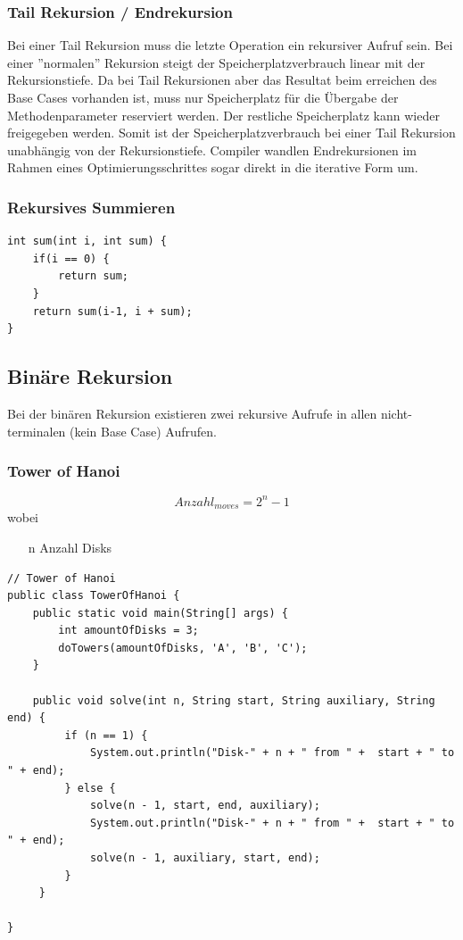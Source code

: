 \subsubsection{Tail Rekursion / Endrekursion}
Bei einer Tail Rekursion muss die letzte Operation ein rekursiver Aufruf sein. Bei einer ''normalen'' Rekursion steigt der Speicherplatzverbrauch linear mit der Rekursionstiefe. Da bei Tail Rekursionen aber das Resultat beim erreichen des Base Cases vorhanden ist, muss nur Speicherplatz für die Übergabe der Methodenparameter reserviert werden. Der restliche Speicherplatz kann wieder freigegeben werden.  Somit ist der Speicherplatzverbrauch bei einer Tail Rekursion unabhängig von der Rekursionstiefe. Compiler wandlen Endrekursionen im Rahmen eines Optimierungsschrittes sogar direkt in die iterative Form um.

\subsubsection{Rekursives Summieren}
\begin{lstlisting}
int sum(int i, int sum) { 
	if(i == 0) {
		return sum; 
	} 
	return sum(i-1, i + sum);  
}
\end{lstlisting}



\subsection{Binäre Rekursion}
Bei der binären Rekursion existieren zwei rekursive Aufrufe in allen nicht-terminalen (kein Base Case) Aufrufen. 

\subsubsection{Tower of Hanoi}
\[
	Anzahl_{moves} = 2^n - 1
\]
wobei
\begin{itemize}[label=]
	\item[n] Anzahl Disks
\end{itemize}

\begin{lstlisting}
// Tower of Hanoi
public class TowerOfHanoi {
	public static void main(String[] args) {
		int amountOfDisks = 3;
		doTowers(amountOfDisks, 'A', 'B', 'C');
	}
	
	public void solve(int n, String start, String auxiliary, String end) {
		 if (n == 1) {
			 System.out.println("Disk-" + n + " from " +  start + " to " + end);
		 } else {
			 solve(n - 1, start, end, auxiliary);
			 System.out.println("Disk-" + n + " from " +  start + " to " + end);
			 solve(n - 1, auxiliary, start, end);
		 }
	 }
	 
}
\end{lstlisting}


